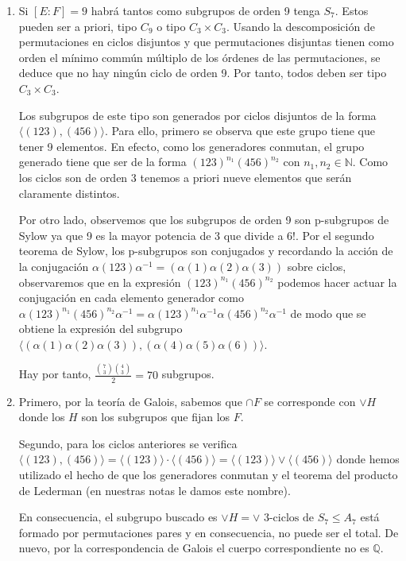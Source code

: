 \documentclass{article}
\theoremstyle{theorem-style}  %
\theoremstyle{definition-style}
\theoremstyle{example-style}
\begin{document}
\begin{enumerate}
\item Si $[E:F] = 9$ habrá tantos como subgrupos de orden 9 tenga $S_7$. Estos pueden ser a priori, tipo $C_9$ o tipo $C_3 \times C_3$. Usando la descomposición de permutaciones en ciclos disjuntos y que permutaciones disjuntas tienen como orden el mínimo commún múltiplo de los órdenes de las permutaciones, se deduce que no hay ningún ciclo de orden 9. Por tanto, todos deben ser tipo $C_3 \times C_3$.

Los subgrupos de este tipo son generados por ciclos disjuntos de la forma $\langle (123),(456) \rangle$. Para ello, primero se observa que este grupo tiene que tener 9 elementos. En efecto, como los generadores conmutan, el grupo generado tiene que ser de la forma $(123)^{n_1} (456)^{n_2}$ con $n_1,n_2 \in \mathbb{N}$. Como los ciclos son de orden 3 tenemos a priori nueve elementos que serán claramente distintos. 

Por otro lado, observemos que los subgrupos de orden 9 son p-subgrupos de Sylow ya que 9 es la mayor potencia de 3 que divide a $6!$. Por el segundo teorema de Sylow, los p-subgrupos son conjugados y recordando la acción de la conjugación $\alpha (123) \alpha^{-1} = (\alpha(1)\alpha(2)\alpha(3))$ sobre ciclos, observaremos que en la expresión $(123)^{n_1} (456)^{n_2}$ podemos hacer actuar la conjugación en cada elemento generador como $\alpha(123)^{n_1} (456)^{n_2}\alpha^{-1} = \alpha(123)^{n_1}\alpha^{-1}\alpha(456)^{n_2}\alpha^{-1}$ de modo que se obtiene la expresión del subgrupo $\langle (\alpha(1)\alpha(2)\alpha(3)),(\alpha(4)\alpha(5)\alpha(6)) \rangle$. 

Hay por tanto, $\frac{\binom{7}{3}\binom{4}{3}}{2} = 70$  subgrupos. 

\item Primero, por la teoría de Galois, sabemos que $\cap F$ se corresponde con $\lor H$ donde los $H$ son los subgrupos que fijan los $F$. 

Segundo, para los ciclos anteriores se verifica $\langle (123),(456) \rangle = \langle (123) \rangle \cdot \langle (456) \rangle = \langle (123) \rangle \lor \langle (456) \rangle$ donde hemos utilizado el hecho de que los generadores conmutan y el teorema del producto de Lederman (en nuestras notas le damos este nombre). 

En consecuencia, el subgrupo buscado es $\lor H = \lor \text{ 3-ciclos de } S_7 \le A_7$ está formado por permutaciones pares y en consecuencia, no puede ser el total. De nuevo, por la correspondencia de Galois el cuerpo correspondiente no es $\mathbb{Q}$.


\end{enumerate}
\end{document}
